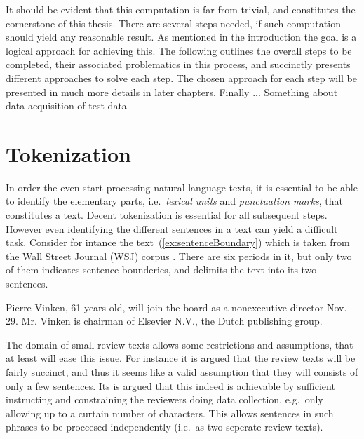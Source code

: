  It should be evident that this computation is far from trivial, and constitutes the cornerstone of this thesis. There are several steps needed, if such computation should yield any reasonable result. As mentioned in the introduction the goal is a logical approach for achieving this. The following outlines the overall steps to be completed, their associated problematics in this process, and succinctly presents different approaches to solve each step. The chosen approach for each step will be presented in much more details in later chapters. Finally ... Something about data acquisition of test-data

\section{Tokenization}
In order the even start processing natural language texts, it is essential to be able to identify the elementary parts, i.e.\ \emph{lexical units} and \emph{punctuation marks}, that constitutes a text. Decent tokenization is essential for all subsequent steps. However even identifying the different sentences in a text can yield a difficult task. Consider for intance the text~(\ref{ex:sentenceBoundary}) which is taken from the Wall Street Journal (WSJ) corpus \cite{wsjCorpus}. There are six periods in it, but only two of them indicates sentence bounderies, and delimits the text into its two sentences.

\begin{numquote}
  Pierre Vinken, 61 years old, will join the board as a nonexecutive director Nov. 29. Mr. Vinken is chairman of Elsevier N.V., the Dutch publishing group.  
  \label{ex:sentenceBoundary}
\end{numquote}

The domain of small review texts allows some restrictions and assumptions, that at least will ease this issue. For instance it is argued that the review texts will be fairly succinct, and thus it seems like a valid assumption that they will consists of only a few sentences. Its is argued that this indeed is achievable by sufficient instructing and constraining the reviewers doing data collection, e.g.\ only allowing up to a curtain number of characters. This allows sentences in such phrases to be proccesed independently (i.e.\ as two seperate review texts).

